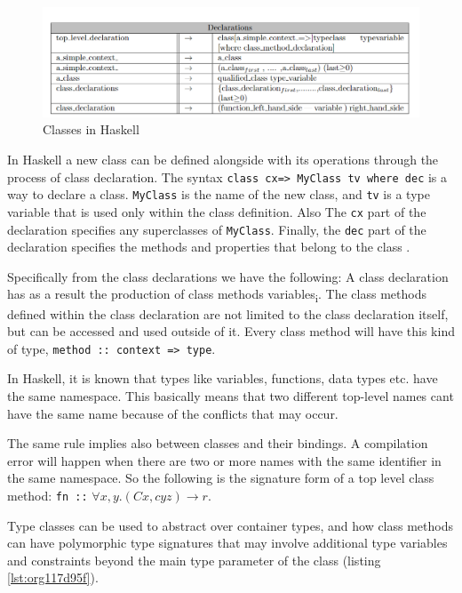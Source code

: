 \documentclass[a4paper, titlepage, twoside]{article}
\begin{document}
\begin{figure}[htbp]
\centering
\includegraphics[width=.9\linewidth]{img/2023-05-25_13-28-35_screenshot.png}
\caption{\label{fig:org1000a8b}Classes in Haskell}
\end{figure}

In Haskell a new class can be defined alongside with its operations through the process of class declaration. The syntax \texttt{class cx=> MyClass tv where dec} is a way to declare a class. \texttt{MyClass} is the name of the new class, and \texttt{tv} is a type variable that is used only within the class definition. Also The \texttt{cx} part of the declaration specifies any superclasses of \texttt{MyClass}. Finally, the \texttt{dec} part of the declaration specifies the methods and properties that belong to the class \autocite[chapter 4.3]{marlowHaskell2010Language2010}.

Specifically from the class declarations we have the following: A class declaration has as a result the production of class methods variables\textsubscript{i}. The class methods defined within the class declaration are not limited to the class declaration itself, but can be accessed and used outside of it. Every class method will have this kind of type, \texttt{method :: context => type}.

In Haskell, it is known that types like variables, functions, data types etc. have the same namespace. This basically means that two different top-level names cant have the same name because of the conflicts that may occur.

The same rule implies also between classes and their bindings. A compilation error will happen when there are two or more names with the same identifier in the same namespace. So the following is the signature form of a top level class method: \texttt{fn ::} \(\forall x, y. (Cx, cyz) \rightarrow r\).

Type classes can be used to abstract over container types, and how class methods can have polymorphic type signatures that may involve additional type variables and constraints beyond the main type parameter of the class (listing \ref{lst:org117d95f}).
\end{document}
